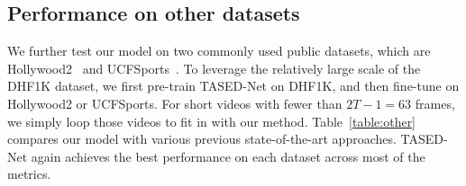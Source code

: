 \documentclass[10pt,twocolumn,letterpaper]{article}
\newcommand{\modelname}{TASED-Net}
\begin{document}
\subsection{Performance on other datasets} \label{subsec:on-other}
We further test our model on two commonly used public datasets, which are Hollywood2~\cite{marszalek2009actions, mathe2015actions} and UCFSports~\cite{mathe2015actions, rodriguez2008action, soomro2014action}. To leverage the relatively large scale of the DHF1K dataset, we first pre-train \modelname{} on DHF1K, and then fine-tune on Hollywood2 or UCFSports. For short videos with fewer than $2T-1=63$ frames, we simply loop those videos to fit in with our method. Table~\ref{table:other} compares our model with various previous state-of-the-art approaches. \modelname{} again achieves the best performance on each dataset across most of the metrics.
\end{document}
